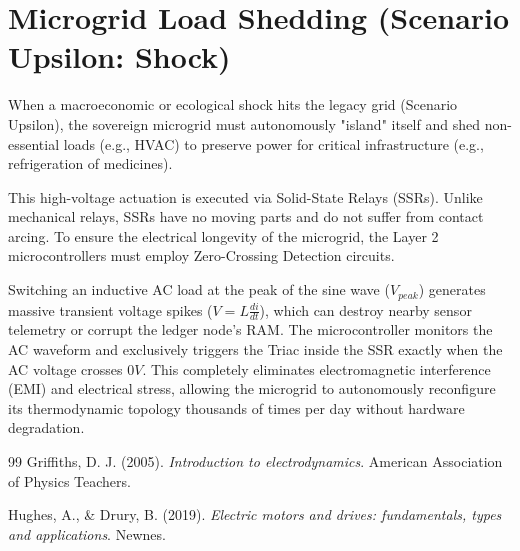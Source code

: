 \section{Microgrid Load Shedding (Scenario Upsilon: Shock)}
When a macroeconomic or ecological shock hits the legacy grid (Scenario Upsilon), the sovereign microgrid must autonomously "island" itself and shed non-essential loads (e.g., HVAC) to preserve power for critical infrastructure (e.g., refrigeration of medicines).

This high-voltage actuation is executed via Solid-State Relays (SSRs). Unlike mechanical relays, SSRs have no moving parts and do not suffer from contact arcing. To ensure the electrical longevity of the microgrid, the Layer 2 microcontrollers must employ Zero-Crossing Detection circuits. 

Switching an inductive AC load at the peak of the sine wave ($V_{peak}$) generates massive transient voltage spikes ($V = L \frac{di}{dt}$), which can destroy nearby sensor telemetry or corrupt the ledger node's RAM. The microcontroller monitors the AC waveform and exclusively triggers the Triac inside the SSR exactly when the AC voltage crosses $0V$. This completely eliminates electromagnetic interference (EMI) and electrical stress, allowing the microgrid to autonomously reconfigure its thermodynamic topology thousands of times per day without hardware degradation.

\vspace{1cm}
\begin{thebibliography}{99}
Griffiths, D. J. (2005). \textit{Introduction to electrodynamics}. American Association of Physics Teachers.

Hughes, A., \& Drury, B. (2019). \textit{Electric motors and drives: fundamentals, types and applications}. Newnes.
\end{thebibliography}
